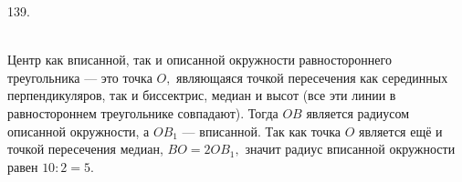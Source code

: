 139. \begin{figure}[ht!]
\end{figure}\\
Центр как вписанной, так и описанной окружности равностороннего треугольника --- это точка $O,$ являющаяся точкой пересечения как серединных перпендикуляров, так и биссектрис, медиан и высот (все эти линии в равностороннем треугольнике совпадают). Тогда $OB$ является радиусом описанной окружности, а $OB_1$ --- вписанной. Так как точка $O$ является ещё и точкой пересечения медиан, $BO=2OB_1,$ значит радиус вписанной окружности равен $10:2=5.$\\
